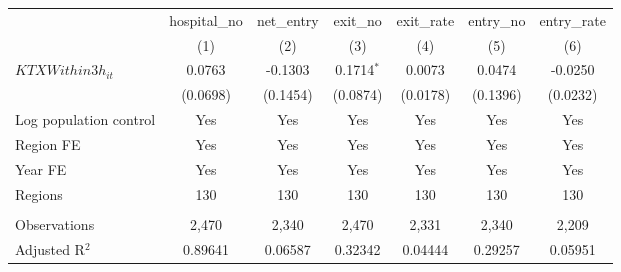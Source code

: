 \begingroup
\centering
\begin{tabular}{lcccccc}
   \toprule
                          & hospital\_no  & net\_entry  & exit\_no     & exit\_rate  & entry\_no  & entry\_rate \\    
                          & (1)           & (2)         & (3)          & (4)         & (5)        & (6)\\  
   \midrule 
   $KTXWithin3h_{it}$     & 0.0763        & -0.1303     & 0.1714$^{*}$ & 0.0073      & 0.0474     & -0.0250\\   
                          & (0.0698)      & (0.1454)    & (0.0874)     & (0.0178)    & (0.1396)   & (0.0232)\\   
   Log population control & Yes           & Yes         & Yes          & Yes         & Yes        & Yes\\  
   Region FE              & Yes           & Yes         & Yes          & Yes         & Yes        & Yes\\  
   Year FE                & Yes           & Yes         & Yes          & Yes         & Yes        & Yes\\  
   Regions                & 130           & 130         & 130          & 130         & 130        & 130\\  
    \\
   Observations           & 2,470         & 2,340       & 2,470        & 2,331       & 2,340      & 2,209\\  
   Adjusted R$^2$         & 0.89641       & 0.06587     & 0.32342      & 0.04444     & 0.29257    & 0.05951\\  
   \bottomrule
\end{tabular}
\par\endgroup
